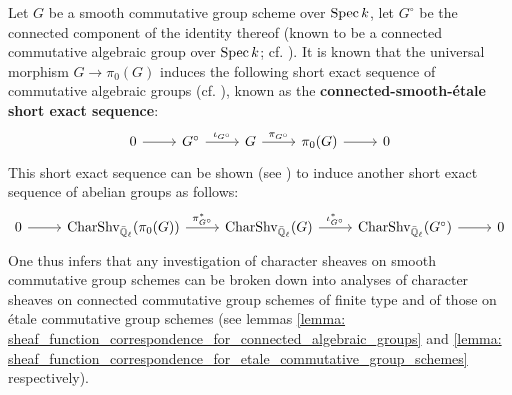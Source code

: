 \begin{remark}
            Let $G$ be a smooth commutative group scheme over $\operatorname{Spec} k$, let $G^{\circ}$ be the connected component of the identity thereof (known to be a connected commutative algebraic group over $\operatorname{Spec} k$; cf. \cite[Lemma 3.2]{cunningham_roe_function_sheaf_dictionary_quasi_characters_p_adic_tori}). It is known that the universal morphism $G \to \pi_0(G)$ induces the following short exact sequence of commutative algebraic groups (cf. \cite[Proposition 5.48]{milne_algebraic_groups}), known as the \textbf{connected-smooth-\'etale short exact sequence}:
                $$
                    \begin{tikzcd}
                    	0 & {G^{\circ}} & G & {\pi_0(G)} & 0
                    	\arrow[from=1-1, to=1-2]
                    	\arrow["{\iota_{G^{\circ}}}", from=1-2, to=1-3]
                    	\arrow["{\pi_{G^{\circ}}}", from=1-3, to=1-4]
                    	\arrow[from=1-4, to=1-5]
                    \end{tikzcd}
                $$
            This short exact sequence can be shown (see \cite[Proposition 3.3, Lemma 3.4, and Proposition 3.5]{cunningham_roe_function_sheaf_dictionary_quasi_characters_p_adic_tori}) to induce another short exact sequence of abelian groups as follows:
                $$
                    \begin{tikzcd}
                    	0 & {\Char\Shv_{\bar{\Q}_{\ell}}(\pi_0(G))} & {\Char\Shv_{\bar{\Q}_{\ell}}(G)} & {\Char\Shv_{\bar{\Q}_{\ell}}(G^{\circ})} & 0
                    	\arrow[from=1-1, to=1-2]
                    	\arrow["{\pi_{G^{\circ}}^*}", from=1-2, to=1-3]
                    	\arrow["{\iota_{G^{\circ}}^*}", from=1-3, to=1-4]
                    	\arrow[from=1-4, to=1-5]
                    \end{tikzcd}
                $$
            One thus infers that any investigation of character sheaves on smooth commutative group schemes can be broken down into analyses of character sheaves on connected commutative group schemes of finite type and of those on \'etale commutative group schemes (see lemmas \ref{lemma: sheaf_function_correspondence_for_connected_algebraic_groups} and \ref{lemma: sheaf_function_correspondence_for_etale_commutative_group_schemes} respectively).
        \end{remark}
        
